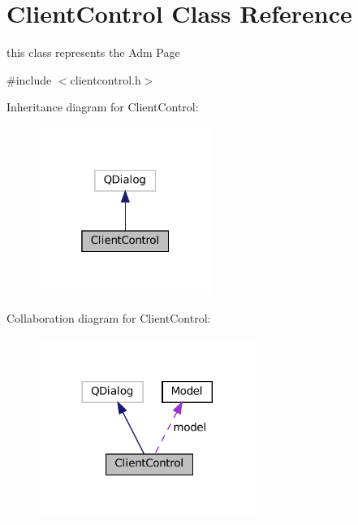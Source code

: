 \hypertarget{classClientControl}{}\section{Client\+Control Class Reference}
\label{classClientControl}


this class represents the Adm Page  




{\ttfamily \#include $<$clientcontrol.\+h$>$}



Inheritance diagram for Client\+Control\+:\nopagebreak
\begin{figure}[H]
\begin{center}
\leavevmode
\includegraphics[width=160pt]{classClientControl__inherit__graph}
\end{center}
\end{figure}


Collaboration diagram for Client\+Control\+:\nopagebreak
\begin{figure}[H]
\begin{center}
\leavevmode
\includegraphics[width=200pt]{classClientControl__coll__graph}
\end{center}
\end{figure}
